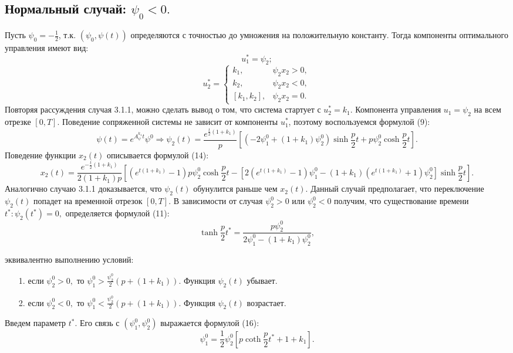 \documentclass[11pt]{article}
\begin{document}
{{\subsection{Нормальный случай: $\psi_0 < 0.$}
{Пусть $\psi_0 = -\frac{1}{2}$, т.к. $(\psi_0,\psi(t))$ определяются с точностью до умножения на положительную константу. Тогда компоненты оптимального управления имеют вид:}
\begin{equation}
u_1^* = \psi_2;
\end{equation}
\begin{equation}
u_2^* = \begin{cases}
k_1, & \psi_2x_2 > 0,\\
k_2, & \psi_2x_2 < 0,\\
[k_1,k_2], &\psi_2x_2 = 0.
\end{cases}
\end{equation}
{Повторяя рассуждения случая 3.1.1, можно сделать вывод о том, что система стартует с $u_2^* = k_1.$ Компонента управления $u_1 = \psi_2$ на всем отрезке $[0,T].$ Поведение сопряженной системы не зависит от компоненты $u_1^*$, поэтому воспользуемся формулой (9):}  
\[ \psi(t) = e^{A^{k_1}_\psi t}\psi^0 \Rightarrow \psi_2(t) = \frac{e^{\frac{t}{2}(1 + k_1)}}{p}[(-2\psi_1^0 + (1+k_1)\psi_2^0)\sinh\frac{p}{2}t + p\psi_2^0\cosh\frac{p}{2}t]. \]
{Поведение функции $x_2(t)$ описывается формулой (14):}
\[  	x_2(t) = \frac{e^{-\frac{t}{2}(1 + k_1)}}{2(1+k_1)p}[(e^{t(1 + k_1)} - 1)p\psi_2^0\cosh\frac{p}{2}t - [2(e^{t(1 + k_1)} - 1)\psi_1^0 - (1 + k_1)(e^{t(1 + k_1)}+1)\psi_2^0]\sinh\frac{p}{2}t].\]
{Аналогично случаю 3.1.1 доказывается, что $\psi_2(t)$ обунулится раньше чем $x_2(t).$ Данный случай предполагает, что переключение $\psi_2(t)$ попадет на временной отрезок $[0,T]$. В зависимости от случая $\psi_2^0 > 0$ или $\psi_2^0 < 0$ получим, что существование времени $t^*:\psi_2(t^*) = 0,$ определяется формулой (11):} 
\[  \tanh\frac{p}{2}t^* = \frac{p\psi_2^0}{2\psi_1^0 - (1 + k_1)\psi_2^0},  \]  
{эквивалентно выполнению условий:
\begin{itemize}
	\item [1.]{если $\psi_2^0 > 0,$ то $\psi_1^0 > \frac{\psi_2^0}{2}(p + (1 + k_1)).$ Функция $\psi_2(t)$ убывает. }
	\item [2.]{если $\psi_2^0 < 0,$ то $\psi_1^0 < \frac{\psi_2^0}{2}(p + (1 + k_1)).$ Функция $\psi_2(t)$ возрастает.}
\end{itemize}
Введем параметр $t^*.$ Его связь с $(\psi_1^0,\psi_2^0)$ выражается формулой (16):
\[ \psi_1^0 = \frac{1}{2}\psi_2^0[p\coth\frac{p}{2}t^* + 1 + k_1].  \]
}}}
\end{document}
